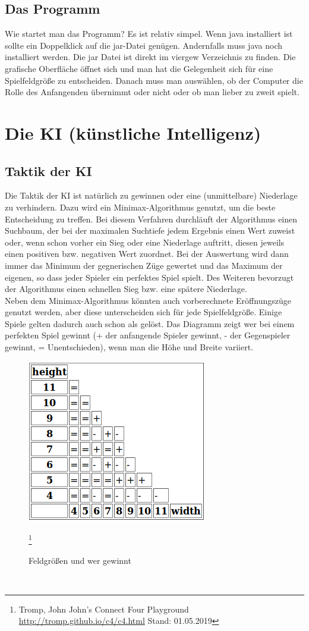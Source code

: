 \documentclass[12pt,a4paper]{article}
\begin{document}
	\subsection{Das Programm}
	Wie startet man das Programm? Es ist relativ simpel. Wenn java installiert ist sollte ein Doppelklick auf die jar-Datei genügen. Andernfalls muss java noch installiert werden. Die jar Datei ist direkt im viergew Verzeichnis zu finden. Die grafische Oberfläche öffnet sich und man hat die Gelegenheit sich für eine Spielfeldgröße zu entscheiden. Danach muss man auswählen, ob der Computer die Rolle des Anfangenden übernimmt oder nicht oder ob man lieber zu zweit spielt.
	\section{Die KI (künstliche Intelligenz)}
	\subsection{Taktik der KI}
	Die Taktik der KI ist natürlich zu gewinnen oder eine (unmittelbare) Niederlage zu verhindern. Dazu wird ein Minimax-Algorithmus genutzt, um die beste Entscheidung zu treffen. Bei diesem Verfahren durchläuft der Algorithmus einen Suchbaum, der bei der maximalen Suchtiefe jedem Ergebnis einen Wert zuweist oder, wenn schon vorher ein Sieg oder eine Niederlage auftritt, diesen jeweils einen positiven bzw. negativen Wert zuordnet. Bei der Auswertung wird dann immer das Minimum der gegnerischen Züge gewertet und das Maximum der eigenen, so dass jeder Spieler ein \glqq perfektes \grqq{} Spiel spielt. Des Weiteren bevorzugt der Algorithmus einen schnellen Sieg bzw. eine spätere Niederlage.\\
	Neben dem Minimax-Algorithmus könnten auch vorberechnete Eröffnungszüge genutzt werden, aber diese unterscheiden sich für jede Spielfeldgröße. Einige Spiele gelten dadurch auch schon als gelöst. Das Diagramm zeigt wer bei einem perfekten Spiel gewinnt (+ der anfangende Spieler gewinnt, - der Gegenspieler gewinnt, = Unentschieden), wenn man die Höhe und Breite variiert.
	\begin{figure}[h]
		\centering
		\includegraphics[width=0.5\linewidth, height=0.3\textheight]{w-h-viergew}
		\caption{Feldgrößen und wer gewinnt}
		\label{fig:w-h-viergew}
		\footnote{Tromp, John  \glqq John's Connect Four Playground \grqq{} \url{http://tromp.github.io/c4/c4.html} Stand: 01.05.2019}
	\end{figure}
\\
\end{document}
